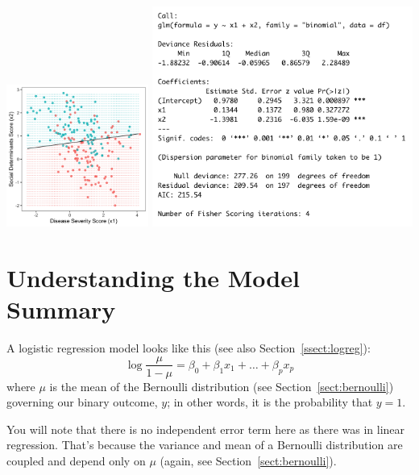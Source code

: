 \begin{center}
\includegraphics[width=0.35\textwidth]{img/esl-logistic.png}
\includegraphics[width=0.64\textwidth]{img/glm-binomial-example.png}
\end{center}


\section{Understanding the Model Summary}

A logistic regression model looks like this (see also Section~\ref{ssect:logreg}):
\begin{equation} \log \frac{\mu}{1-\mu} = \beta_0 + \beta_1 x_1 + \dots + \beta_p x_p \label{eqn:logistic} \end{equation}
where $\mu$ is the mean of the Bernoulli distribution (see Section~\ref{sect:bernoulli}) governing our binary outcome, $y$; in other words, it is the probability that $y = 1$. 

You will note that there is no independent error term here as there was in linear regression. That's because the variance and mean of a Bernoulli distribution are coupled and depend only on $\mu$ (again, see Section~\ref{sect:bernoulli}). 
\vspace{3mm}

